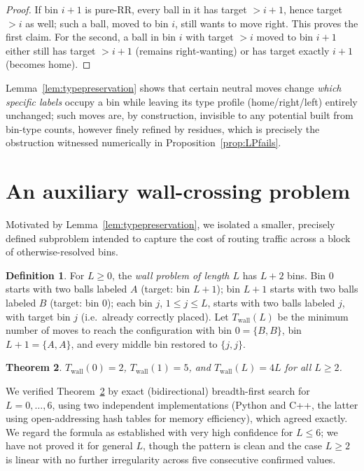 \documentclass[11pt]{amsart}
\theoremstyle{plain}
\newtheorem{theorem}{Theorem}[section]
\theoremstyle{definition}
\newtheorem{definition}[theorem]{Definition}
\theoremstyle{remark}
\begin{document}
\begin{proof}
If bin $i+1$ is pure-RR, every ball in it has target $>i+1$, hence target $>i$ as well; such a ball, moved to bin $i$, still wants to move right. This proves the first claim. For the second, a ball in bin $i$ with target $>i$ moved to bin $i+1$ either still has target $>i+1$ (remains right-wanting) or has target exactly $i+1$ (becomes home).
\end{proof}

Lemma~\ref{lem:typepreservation} shows that certain neutral moves change \emph{which specific labels} occupy a bin while leaving its type profile (home/right/left) entirely unchanged; such moves are, by construction, invisible to any potential built from bin-type counts, however finely refined by residues, which is precisely the obstruction witnessed numerically in Proposition~\ref{prop:LPfails}.

\section{An auxiliary wall-crossing problem}
\label{sec:wall}

Motivated by Lemma~\ref{lem:typepreservation}, we isolated a smaller, precisely defined subproblem intended to capture the cost of routing traffic across a block of otherwise-resolved bins.

\begin{definition}
\label{def:wallproblem}
For $L\ge 0$, the \emph{wall problem of length $L$} has $L+2$ bins. Bin $0$ starts with two balls labeled $A$ (target: bin $L+1$); bin $L+1$ starts with two balls labeled $B$ (target: bin $0$); each bin $j$, $1\le j\le L$, starts with two balls labeled $j$, with target bin $j$ (i.e.\ already correctly placed). Let $T_{\mathrm{wall}}(L)$ be the minimum number of moves to reach the configuration with bin $0=\{B,B\}$, bin $L+1=\{A,A\}$, and every middle bin restored to $\{j,j\}$.
\end{definition}

\begin{theorem}
\label{thm:wallformula}
$T_{\mathrm{wall}}(0)=2$, $T_{\mathrm{wall}}(1)=5$, and $T_{\mathrm{wall}}(L) = 4L$ for all $L\ge 2$.
\end{theorem}

We verified Theorem~\ref{thm:wallformula} by exact (bidirectional) breadth-first search for $L=0,\dots,6$, using two independent implementations (Python and C++, the latter using open-addressing hash tables for memory efficiency), which agreed exactly. We regard the formula as established with very high confidence for $L\le 6$; we have not proved it for general $L$, though the pattern is clean and the case $L\ge 2$ is linear with no further irregularity across five consecutive confirmed values.
\end{document}
